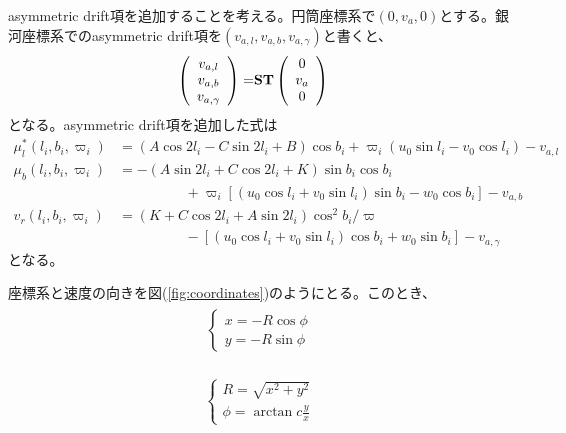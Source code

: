 asymmetric drift項を追加することを考える。円筒座標系で$(0,v_a,0)$とする。銀河座標系でのasymmetric drift項を$(v_{a,l},v_{a,b},v_{a,\gamma})$と書くと、
\begin{align}
\begin{aligned}
	\left(
	\begin{array}{c}
	 	v_{a,l}\\
		v_{a,b}\\
		v_{a,\gamma}
	\end{array}
	\right)
	=& \bf{S} \bf{T}
	\left(
	\begin{array}{c}
	 	0\\
		v_a\\
		0
	\end{array}
	\right)
\end{aligned}
\end{align}
となる。asymmetric drift項を追加した式は
\begin{subequations}
\begin{align}
	\mu^*_l(l_i,b_i,\varpi_i) &= (A\cos2l_i - C\sin2l_i + B)\cos b_i + \varpi_i(u_0\sin l_i - v_0\cos l_i) - v_{a,l} \\
	\mu_b(l_i,b_i,\varpi_i) &= -(A\sin2l_i + C\cos2l_i + K)\sin b_i \cos b_i \nonumber \\
	                          & \hspace{2cm} + \varpi_i[(u_0\cos l_i + v_0 \sin l_i)\sin b_i - w_0 \cos b_i] - v_{a,b} \\
	v_r(l_i,b_i,\varpi_i) &= (K + C\cos2l_i + A\sin2l_i)\cos^2 b_i / \varpi \nonumber \\
	                      & \hspace{2cm} - [(u_0\cos l_i + v_0 \sin l_i)\cos b_i + w_0 \sin b_i] - v_{a,\gamma}
\end{align}
\end{subequations}
となる。


座標系と速度の向きを図(\ref{fig:coordinates})のようにとる。このとき、
\begin{align}
\begin{aligned}
    \begin{cases}
    x = -R\cos{\phi}\\
    y = -R\sin{\phi}
    \end{cases}
\end{aligned}
\end{align}

\begin{align}
\begin{aligned}
    \begin{cases}
    R = \sqrt{x^2 + y^2}\\
    \phi = \arctan{c\frac{y}{x}}
    \end{cases}
\end{aligned}
\end{align}


